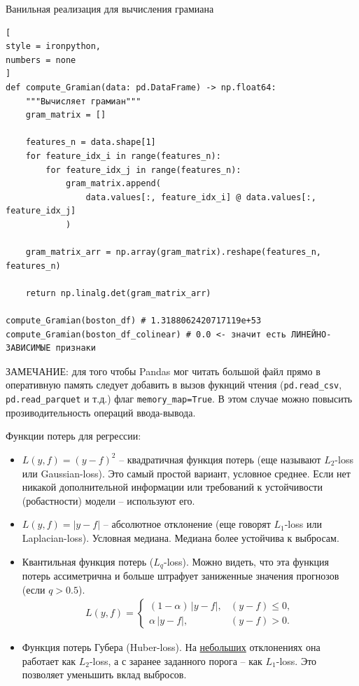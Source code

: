 \documentclass[%
	11pt,
	a4paper,
	utf8,
		]{article}
\begin{document}
Ванильная реализация для вычисления грамиана
\begin{lstlisting}[
style = ironpython,
numbers = none	
]
def compute_Gramian(data: pd.DataFrame) -> np.float64:
    """Вычисляет грамиан"""
    gram_matrix = []

    features_n = data.shape[1]
    for feature_idx_i in range(features_n):
        for feature_idx_j in range(features_n):
            gram_matrix.append(
                data.values[:, feature_idx_i] @ data.values[:, feature_idx_j]
            )

    gram_matrix_arr = np.array(gram_matrix).reshape(features_n, features_n)

    return np.linalg.det(gram_matrix_arr)
    
compute_Gramian(boston_df) # 1.3188062420717119e+53
compute_Gramian(boston_df_colinear) # 0.0 <- значит есть ЛИНЕЙНО-ЗАВИСИМЫЕ признаки
\end{lstlisting}

ЗАМЕЧАНИЕ: для того чтобы Pandas мог читать большой файл прямо в оперативную память следует добавить в вызов фукнций чтения (\texttt{pd.read\_csv}, \texttt{pd.read\_parquet} и т.д.) флаг \texttt{memory\_map=True}. В этом случае можно повысить прозиводительность операций ввода-вывода.

Функции потерь для регрессии:
\begin{itemize}
	\item $ L(y, f) = (y - f)^2 $ -- квадратичная функция потерь (еще называют $ L_2 $-loss или Gaussian-loss). Это самый простой вариант, условное среднее. Если нет никакой дополнительной информации или требований к устойчивости (робастности) модели -- используют его.
	
	\item $ L(y, f) = | y - f | $ -- абсолютное отклонение (еще говорят $ L_1 $-loss или Laplacian-loss). Условная медиана. Медиана более устойчива к выбросам.
	
	\item Квантильная функция потерь ($ L_q $-loss). Можно видеть, что эта функция потерь ассиметрична и больше штрафует заниженные значения прогнозов (если $ q > 0.5 $).
\begin{align*}
	L(y, f) =
	\begin{cases}
		(1 - \alpha) \, | y - f |, & (y - f) \leqslant 0, \\
		\alpha \, | y - f |, & (y - f) > 0.
	\end{cases}
\end{align*}

    \item Функция потерь Губера (Huber-loss). На \underline{небольших} отклонениях она работает как $ L_2 $-loss, а с заранее заданного порога -- как $ L_1 $-loss. Это позволяет уменьшить вклад выбросов.
\end{itemize}
\end{document}
